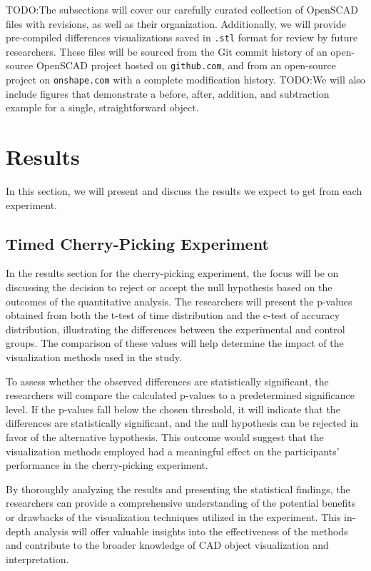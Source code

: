 \documentclass[sigconf,authorversion,nonacm]{acmart}
\begin{document}
TODO:The subsections will cover our carefully curated collection of OpenSCAD files with revisions, as well as their organization. Additionally, we will provide pre-compiled differences visualizations saved in \texttt{.stl} format for review by future researchers. These files will be sourced from the Git commit history of an open-source OpenSCAD project hosted on \texttt{github.com}, and from an open-source project on \texttt{onshape.com} with a complete modification history.
TODO:We will also include figures that demonstrate a before, after, addition, and subtraction example for a single, straightforward object.

\section{Results}

In this section, we will present and discuss the results we expect to get from each experiment.

\subsection{Timed Cherry-Picking Experiment}

In the results section for the cherry-picking experiment, the focus will be on discussing the decision to reject or accept the null hypothesis based on the outcomes of the quantitative analysis.
The researchers will present the p-values obtained from both the t-test of time distribution and the c-test of accuracy distribution, illustrating the differences between the experimental and control groups.
The comparison of these values will help determine the impact of the visualization methods used in the study.

To assess whether the observed differences are statistically significant, the researchers will compare the calculated p-values to a predetermined significance level.
If the p-values fall below the chosen threshold, it will indicate that the differences are statistically significant, and the null hypothesis can be rejected in favor of the alternative hypothesis.
This outcome would suggest that the visualization methods employed had a meaningful effect on the participants' performance in the cherry-picking experiment.

By thoroughly analyzing the results and presenting the statistical findings, the researchers can provide a comprehensive understanding of the potential benefits or drawbacks of the visualization techniques utilized in the experiment.
This in-depth analysis will offer valuable insights into the effectiveness of the methods and contribute to the broader knowledge of CAD object visualization and interpretation.
\end{document}
